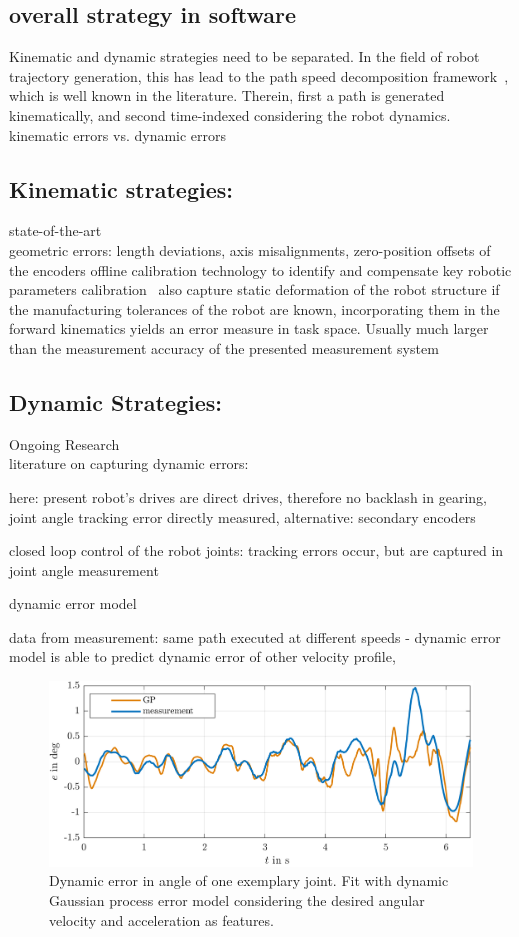 \documentclass[5p,times,procedia]{elsarticle}
\begin{document}
\subsection{overall strategy in software}
Kinematic and dynamic strategies need to be separated. 
In the field of robot trajectory generation, this has lead to the path speed decomposition framework~\cite{Choset05}, which is well known in the literature. 
Therein, first a path is generated kinematically, and second time-indexed considering the robot dynamics. 
kinematic errors vs. dynamic errors 

\subsection{Kinematic strategies:} state-of-the-art\\
geometric errors: length deviations, axis misalignments, zero-position offsets of the encoders
offline calibration technology to identify and compensate key robotic parameters
calibration~\cite{Wiest01}
also capture static deformation of the robot structure
if the manufacturing tolerances of the robot are known, incorporating them in the forward kinematics yields an error measure in task space. Usually much larger than the measurement accuracy of the presented measurement system

\subsection{Dynamic Strategies:} Ongoing Research \\
literature on capturing dynamic errors:

here: present robot's drives are direct drives, therefore no backlash in gearing, joint angle tracking error directly measured, alternative: secondary encoders~\cite{Mesmer22}

closed loop control of the robot joints: tracking errors occur, but are captured in joint angle measurement

dynamic error model

data from measurement: same path executed at different speeds - dynamic error model is able to predict dynamic error of other velocity profile,

\begin{figure}[h]
	\centering
	\includegraphics[width=\columnwidth]{graphics/GP_eOf_dqDes_ddqDes_trainedOnFastestAndSlowest.png}
	\caption{Dynamic error in angle of one exemplary joint. Fit with dynamic Gaussian process error model considering the desired angular velocity and acceleration as features.}
	\label{fig:error_sources}
\end{figure}
\end{document}
